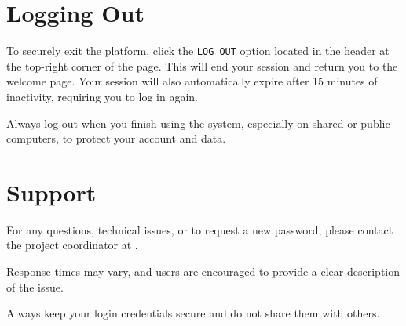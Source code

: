 \chapter{Logging Out} \label{chap:user-logout}

To securely exit the platform, click the \texttt{LOG OUT} option located in the header at the top-right corner of the page. This will end your session and return you to the welcome page. Your session will also automatically expire after 15 minutes of inactivity, requiring you to log in again. 

Always log out when you finish using the system, especially on shared or public computers, to protect your account and data.


\chapter{Support} \label{chap:user-support}

For any questions, technical issues, or to request a new password, please contact the project coordinator at \href{mailto:\prjMail}{\prjMail}. 

Response times may vary, and users are encouraged to provide a clear description of the issue. 

Always keep your login credentials secure and do not share them with others.




